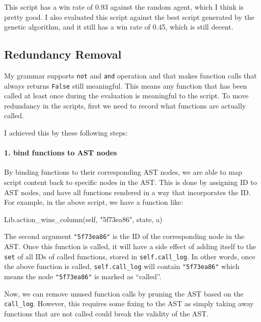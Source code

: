 \documentclass[]{article}
\newenvironment{Shaded}{}{}
\newcommand{\StringTok}[1]{\textcolor[rgb]{0.25,0.44,0.63}{#1}}
\newcommand{\VariableTok}[1]{\textcolor[rgb]{0.10,0.09,0.49}{#1}}
\newcommand{\NormalTok}[1]{#1}
\let\oldparagraph\paragraph
\renewcommand{\paragraph}[1]{\oldparagraph{#1}\mbox{}}
\begin{document}
This script has a win rate of 0.93 against the random agent, which I
think is pretty good. I also evaluated this script against the best
script generated by the genetic algorithm, and it still has a win rate
of 0.45, which is still decent.

\subsection{Redundancy Removal}\label{redundancy-removal}

My grammar supports \texttt{not} and \texttt{and} operation and that
makes function calls that always returns \texttt{False} still
meaningful. This means any function that has been called at least once
during the evaluation is meaningful to the script. To move redundancy in
the scripts, first we need to record what functions are actually called.

I achieved this by these following steps:

\paragraph{1. bind functions to AST
nodes}\label{bind-functions-to-ast-nodes}

By binding functions to their corresponding AST nodes, we are able to
map script content back to specific nodes in the AST. This is done by
assigning ID to AST nodes, and have all functions rendered in a way that
incorporates the ID. For example, in the above script, we have a
function like:

\begin{Shaded}
\begin{Highlighting}[]
\NormalTok{Lib.action_wins_column(}\VariableTok{self}\NormalTok{, }\StringTok{"5f73ea86"}\NormalTok{, state, a)}
\end{Highlighting}
\end{Shaded}

The second argument \texttt{"5f73ea86"} is the ID of the corresponding
node in the AST. Once this function is called, it will have a side
effect of adding itself to the \texttt{set} of all IDs of called
functions, stored in \texttt{self.call\_log}. In other words, once the
above function is called, \texttt{self.call\_log} will contain
\texttt{"5f73ea86"} which means the node \texttt{"5f73ea86"} is marked
as ``called''.

Now, we can remove unused function calls by pruning the AST based on the
\texttt{call\_log}. However, this requires some fixing to the AST as
simply taking away functions that are not called could break the
validity of the AST.
\end{document}
